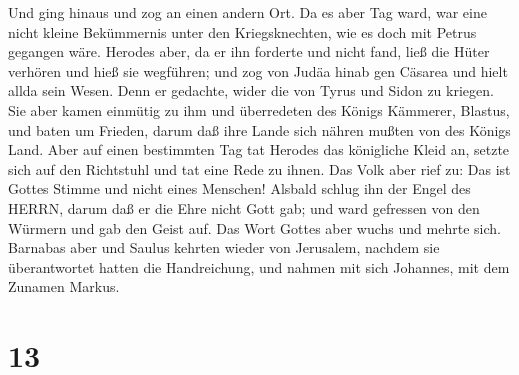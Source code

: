 Und ging hinaus und zog an einen andern Ort.  Da es aber
Tag ward, war eine nicht kleine Bekümmernis unter den Kriegsknechten,
wie es doch mit Petrus gegangen wäre.  Herodes aber, da er
ihn forderte und nicht fand, ließ die Hüter verhören und hieß sie
wegführen; und zog von Judäa hinab gen Cäsarea und hielt allda sein
Wesen.  Denn er gedachte, wider die von Tyrus und Sidon zu
kriegen. Sie aber kamen einmütig zu ihm und überredeten des Königs
Kämmerer, Blastus, und baten um Frieden, darum daß ihre Lande sich
nähren mußten von des Königs Land.  Aber auf einen
bestimmten Tag tat Herodes das königliche Kleid an, setzte sich auf den
Richtstuhl und tat eine Rede zu ihnen.  Das Volk aber rief
zu: Das ist Gottes Stimme und nicht eines Menschen! 
Alsbald schlug ihn der Engel des HERRN, darum daß er die Ehre nicht Gott
gab; und ward gefressen von den Würmern und gab den Geist auf.
 Das Wort Gottes aber wuchs und mehrte sich. 
Barnabas aber und Saulus kehrten wieder von Jerusalem, nachdem sie
überantwortet hatten die Handreichung, und nahmen mit sich Johannes, mit
dem Zunamen Markus.

\hypertarget{section-12}{%
\section{13}\label{section-12}}

